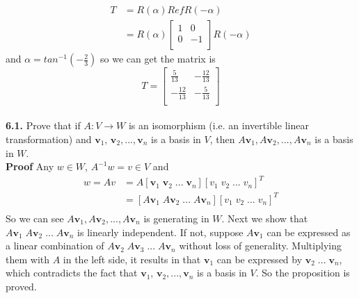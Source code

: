 \documentclass[11pt, a4paper]{article}
\begin{document}
\begin{equation*}
  \begin{split}
    T &= 
    R(\alpha)RefR(-\alpha) \\
    &=
    R(\alpha)
    \begin{bmatrix}
    1 & 0 \\
    0 & -1 \\
    \end{bmatrix}
    R(-\alpha)
  \end{split}
\end{equation*}
and $\alpha = tan^{-1}(-\frac{2}{3})$ so we can get the matrix is 
\begin{equation*}
    T = 
    \begin{bmatrix}
    \frac{5}{13} & -\frac{12}{13} \\
    -\frac{12}{13} & -\frac{5}{13} \\
    \end{bmatrix}
\end{equation*}
\\ \textbf{6.1.} Prove that if $A: V \rightarrow{} W$ is an isomorphism (i.e. an invertible linear transformation) and $\textbf{v$_1$, v$_2$},...,\textbf{v$_n$}$ is a basis in $V$, then $A\textbf{v$_1$}, A\textbf{v$_2$},...,A\textbf{v$_n$}$ is a basis in $W$.\\
\textbf{Proof} Any $w\in W$, $A^{-1}w = v \in V$ and 
\begin{equation*}
	\begin{split}
    w = Av &= A[\textbf{v$_1$}\; \textbf{v$_2$} \; ...\; \textbf{v$_n$}][v_1 \;  v_2 \; ... \; v_n]^T \\
    &= [A\textbf{v$_1$}\; A\textbf{v$_2$} \; ...\; A\textbf{v$_n$}][v_1 \;  v_2 \; ... \; v_n]^T \\
	\end{split}
\end{equation*}
So we can see $A\textbf{v$_1$}, A\textbf{v$_2$}, ..., A\textbf{v$_n$}$ is generating in $W$. Next we show that $A\textbf{v$_1$}\; A\textbf{v$_2$} \; ...\; A\textbf{v$_n$}$ is linearly independent. If not, suppose $A\textbf{v$_1$}$ can be expressed as a linear combination of $ A\textbf{v$_2$} \; A\textbf{v$_3$} \;...\; A\textbf{v$_n$}$ without loss of generality. Multiplying them with $A$ in the left side, it results in that $\textbf{v$_1$}$ can be expressed by $ \textbf{v$_2$} \; ...\; \textbf{v$_n$}$, which contradicts the fact that $\textbf{v$_1$, v$_2$},...,\textbf{v$_n$}$ is a basis in $V$. So the proposition is proved.
\\
\end{document}
